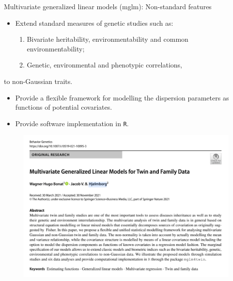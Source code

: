 \documentclass[
  ignorenonframetext,
  serif,
  professionalfont,
  usenames,
  dvipsnames,
  aspectratio = 169]{beamer}
\providecommand{\tightlist}{%
  \setlength{\itemsep}{0pt}\setlength{\parskip}{0pt}}
\renewcommand{\tightlist}{%
  \setlength{\itemsep}{0\baselineskip}
  \setlength{\parskip}{0.25\baselineskip}
}
\def\beginAHalfColumn{\begin{minipage}{0.49\textwidth}}%
\def\endColumns{\end{minipage}}%
\begin{document}
\begin{frame}{Multivariate generalized linear models (mglm):
Non-standard features}
\protect\hypertarget{multivariate-generalized-linear-models-mglm-non-standard-features}{}
\beginAHalfColumn

\begin{itemize}
\tightlist
\item
  Extend standard measures of genetic studies such as:

  \begin{enumerate}
  \tightlist
  \item
    Bivariate heritability, environmentability and common
    environmentability;
  \item
    Genetic, environmental and phenotypic correlations,
  \end{enumerate}
\end{itemize}

to non-Gaussian traits.

\begin{itemize}
\tightlist
\item
  Provide a flexible framework for modelling the dispersion parameters
  as functions of potential covariates.
\item
  Provide software implementation in \texttt{R}.
\end{itemize}

\endColumns
\beginAHalfColumn

\begin{figure}

{\centering \includegraphics[width=0.8\linewidth]{./img/Paper} 

}

\end{figure}

\endColumns
\end{frame}
\end{document}
